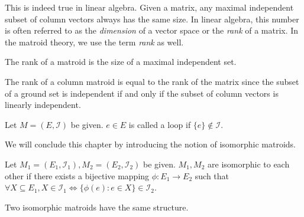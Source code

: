 This is indeed true in linear algebra.
Given a matrix, any maximal independent subset of column vectors always has the same size. In linear algebra, this number is often referred to as the \textit{dimension} of a vector space or the \textit{rank} of a matrix.
In the matroid theory, we use the term \textit{rank} as well.


\begin{defn}
The rank of a matroid is the size of a maximal independent set.
\end{defn}

The rank of a column matroid is equal to the rank of the matrix since the subset of a ground set is independent if and only if the subset of column vectors is linearly independent.

\begin{defn}
Let $M = (E, \mathcal{I})$ be given.
$e \in E$ is called a loop if $\{ e \} \notin \mathcal{I}$.
\end{defn}

We will conclude this chapter by introducing the notion of isomorphic matroids.
\begin{defn}
Let $M_1 = (E_1, \mathcal{I}_1), M_2 = (E_2, \mathcal{I}_2)$ be given.
$M_1, M_2$ are isomorphic to each other if there exists a bijective mapping $\phi: E_1 \rightarrow E_2$ such that
$\forall X \subseteq E_1, X \in \mathcal{I}_1 \iff \{ \phi(e) : e \in X \} \in \mathcal{I}_2$.
\end{defn}

Two isomorphic matroids have the same structure.
